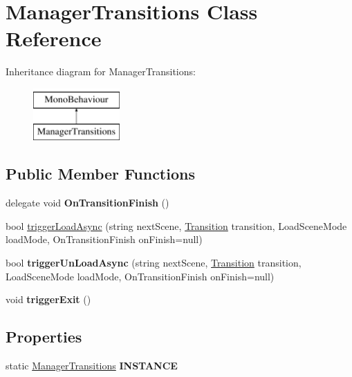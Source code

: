 \hypertarget{class_manager_transitions}{\section{Manager\-Transitions Class Reference}
\label{class_manager_transitions}
}
Inheritance diagram for Manager\-Transitions\-:\begin{figure}[H]
\begin{center}
\leavevmode
\includegraphics[height=2.000000cm]{class_manager_transitions}
\end{center}
\end{figure}
\subsection*{Public Member Functions}
\begin{DoxyCompactItemize}
\item 
\hypertarget{class_manager_transitions_af143a676b64ad9405dee52e0b3524db0}{delegate void {\bfseries On\-Transition\-Finish} ()}\label{class_manager_transitions_af143a676b64ad9405dee52e0b3524db0}

\item 
bool \hyperlink{class_manager_transitions_aeb23059e823543ba248f10d138ebf045}{trigger\-Load\-Async} (string next\-Scene, \hyperlink{class_transition}{Transition} transition, Load\-Scene\-Mode load\-Mode, On\-Transition\-Finish on\-Finish=null)
\item 
\hypertarget{class_manager_transitions_a5d65799742ec1d9c71abf4b69688bc80}{bool {\bfseries trigger\-Un\-Load\-Async} (string next\-Scene, \hyperlink{class_transition}{Transition} transition, Load\-Scene\-Mode load\-Mode, On\-Transition\-Finish on\-Finish=null)}\label{class_manager_transitions_a5d65799742ec1d9c71abf4b69688bc80}

\item 
\hypertarget{class_manager_transitions_a7809ff8c65986d89284ae9a7ad570355}{void {\bfseries trigger\-Exit} ()}\label{class_manager_transitions_a7809ff8c65986d89284ae9a7ad570355}

\end{DoxyCompactItemize}
\subsection*{Properties}
\begin{DoxyCompactItemize}
\item 
\hypertarget{class_manager_transitions_ad87cd9fb9a0e05bb97be220bf3f782e1}{static \hyperlink{class_manager_transitions}{Manager\-Transitions} {\bfseries I\-N\-S\-T\-A\-N\-C\-E}}\label{class_manager_transitions_ad87cd9fb9a0e05bb97be220bf3f782e1}

\end{DoxyCompactItemize}


